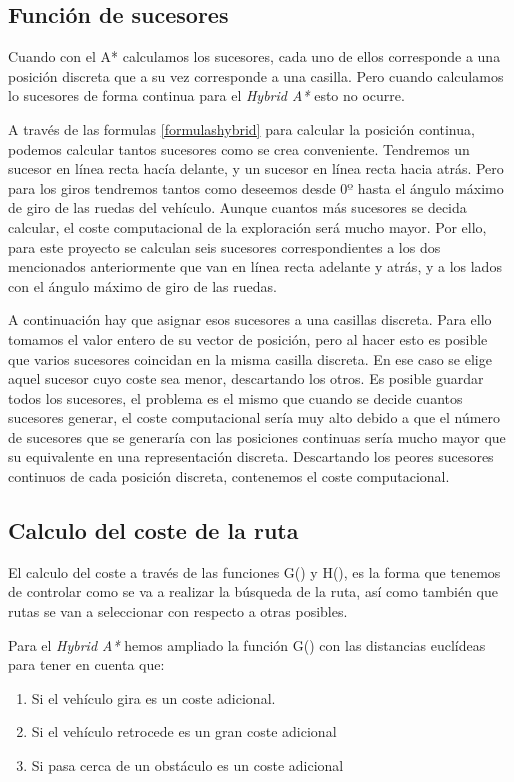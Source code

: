 \subsection{Función de sucesores}
Cuando con el A* calculamos los sucesores, cada uno de ellos corresponde a una posición discreta que a su vez corresponde a una casilla. Pero cuando calculamos lo sucesores de forma continua para el \textit{Hybrid A*} esto no ocurre.

A través de las formulas \ref{formulashybrid} para calcular la posición continua, podemos calcular tantos sucesores como se crea conveniente. Tendremos un sucesor en línea recta hacía delante, y un sucesor en línea recta hacia atrás. Pero para los giros tendremos tantos como deseemos desde $0º$ hasta el ángulo máximo de giro de las ruedas del vehículo. Aunque cuantos más sucesores se decida calcular, el coste computacional de la exploración será mucho mayor. Por ello, para este proyecto se calculan seis sucesores correspondientes a los dos mencionados anteriormente que van en línea recta adelante y atrás, y a los lados con el ángulo máximo de giro de las ruedas.

A continuación hay que asignar esos sucesores a una casillas discreta. Para ello tomamos el valor entero de su vector de posición, pero al hacer esto es posible que varios sucesores coincidan en la misma casilla discreta. En ese caso se elige aquel sucesor cuyo coste sea menor, descartando los otros. Es posible guardar todos los sucesores, el problema es el mismo que cuando se decide cuantos sucesores generar, el coste computacional sería muy alto debido a que el número de sucesores que se generaría con las posiciones continuas sería mucho mayor que su equivalente en una representación discreta. Descartando los peores sucesores continuos de cada posición discreta, contenemos el coste computacional.

\subsection{Calculo del coste de la ruta} \label{hybridcoste}
El calculo del coste a través de las funciones G() y H(), es la forma que tenemos de controlar como se va a realizar la búsqueda de la ruta, así como también que rutas se van a seleccionar con respecto a otras posibles.

Para el \textit{Hybrid A*} hemos ampliado la función G() con las distancias euclídeas para tener en cuenta que:
\begin{enumerate}
\item Si el vehículo gira es un coste adicional.
\item Si el vehículo retrocede es un gran coste adicional
\item Si pasa cerca de un obstáculo es un coste adicional
\end{enumerate}

